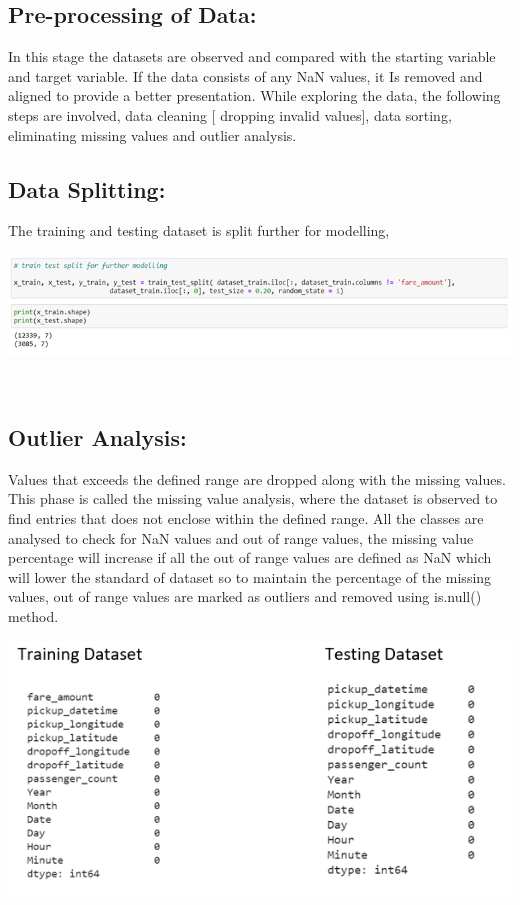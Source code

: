 \documentclass[journal,twoside,web]{ieeecolor}
\begin{document}
\subsection{Pre-processing of Data:}
In this stage the datasets are observed and compared with the starting variable and target variable. If the data consists of any NaN values, it Is removed and aligned to provide a better presentation. While exploring the data, the following steps are involved, data cleaning [ dropping invalid values], data sorting, eliminating missing values and outlier analysis.
\subsection{Data Splitting:}
The training and testing dataset is split further for modelling,
\begin{center}
\includegraphics[scale=0.50]{Picture6.png}
\end{center}
\\
\subsection{Outlier Analysis:}
Values that exceeds the defined range are dropped along with the missing values. This phase is called the missing value analysis, where the dataset is observed to find  entries that does not enclose within the defined range. All the classes are analysed to check for NaN values and out of range values, the missing value percentage will increase if all the out of range values are defined as NaN which will lower the standard of dataset so to maintain the percentage of the missing values, out of range values are marked as outliers and removed using is.null() method.
\begin{center}
\includegraphics[scale=0.70]{Picture10.png}
\end{center}
\\
\end{document}
